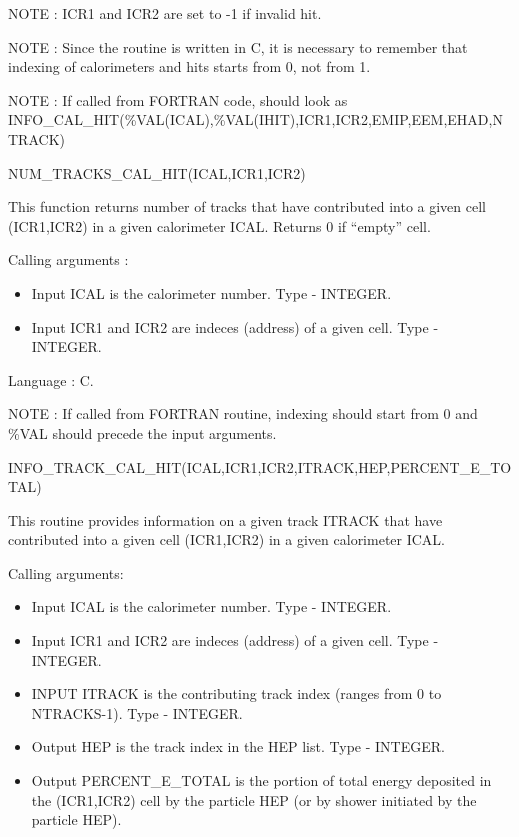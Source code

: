 NOTE : ICR1 and ICR2 are set to -1 if invalid hit.

NOTE : Since the routine is written in C, it is necessary to remember that
indexing of calorimeters and hits starts from 0, not from 1.

NOTE : If called from FORTRAN code, should look as \\
INFO\_CAL\_HIT(\%VAL(ICAL),\%VAL(IHIT),ICR1,ICR2,EMIP,EEM,EHAD,NTRACK)

\bigskip

\begin{center}
NUM\_TRACKS\_CAL\_HIT(ICAL,ICR1,ICR2)
\end{center}

This function returns number of tracks that have contributed into a given cell (ICR1,ICR2)
in a given calorimeter ICAL. Returns 0 if ``empty'' cell.

Calling arguments :
\begin{itemize}
\item{ Input ICAL is the calorimeter number. Type - INTEGER.}
\item{ Input ICR1 and ICR2 are indeces (address) of a given cell. Type - INTEGER.}
\end{itemize}

Language : C.

NOTE : If called from FORTRAN routine, indexing should start from 0 and \%VAL should
precede the input arguments. 


\bigskip
\begin{center}
INFO\_TRACK\_CAL\_HIT(ICAL,ICR1,ICR2,ITRACK,HEP,PERCENT\_E\_TOTAL)
\end{center}

This routine provides information on a given track ITRACK that have contributed
into a given cell (ICR1,ICR2) in a given calorimeter ICAL. 

Calling arguments:
\begin{itemize}
\item{ Input ICAL is the calorimeter number. Type - INTEGER.}
\item{ Input ICR1 and ICR2 are indeces (address) of a given cell. Type - INTEGER.}
\item{ INPUT ITRACK is the contributing track index (ranges from 0 to NTRACKS-1). 
Type - INTEGER. }
\item{ Output HEP is the track index in the HEP list. Type - INTEGER.}
\item{ Output PERCENT\_E\_TOTAL is the portion of total energy deposited in
the (ICR1,ICR2) cell by the particle HEP (or by shower initiated by the
particle HEP).}
\end{itemize}

